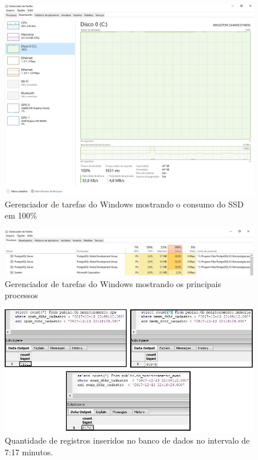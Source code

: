 \begin{figure}[H]
	\centering
	\includegraphics[width=1.0\textwidth]{figuras/MonitorWebApiTeste4/GerenciadorDoWindows5.jpg}
	\caption[Gerenciador de tarefas do Windows mostrando o consumo de recursos]{Gerenciador de tarefas do Windows mostrando o consumo do SSD em 100\%}
	\label{Img:GerenciadorDoWindows5}
\end{figure}

\begin{figure}[H]
	\centering
	\includegraphics[width=1.0\textwidth]{figuras/MonitorWebApiTeste4/GerenciadorDoWindows5-2.jpg}
	\caption[Gerenciador de tarefas do Windows mostrando os principais processos]{Gerenciador de tarefas do Windows mostrando os principais processos}
	\label{Img:GerenciadorDoWindows5-2.jpg}
\end{figure}

\begin{figure}[H]
	\centering
	\includegraphics[width=1.0\textwidth]{figuras/MonitorWebApiTeste4/sql1.jpg}
	\caption[Quantidade de registros inseridos no banco de dados.]{Quantidade de registros inseridos no banco de dados no intervalo de 7:17 minutos.}
	\label{Img:sql1.jpg}
\end{figure}
